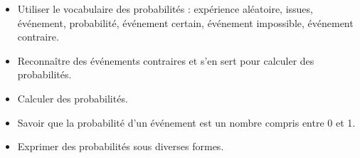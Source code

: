 \begin{prerequis}[Objectifs de 4\up{e}]    
    \begin{itemize}        
        \item Utiliser le vocabulaire des probabilités : expérience aléatoire, issues, événement, probabilité,
        événement certain, événement impossible, événement contraire.
        \item Reconnaître des événements contraires et s’en sert pour calculer des probabilités.
        \item Calculer des probabilités.
        \item Savoir que la probabilité d’un événement est un nombre compris entre 0 et 1.
        \item Exprimer des probabilités sous diverses formes.
    \end{itemize}
\end{prerequis}
